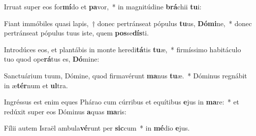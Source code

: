 \item Irruat super eos for\textbf{mí}do et \textbf{pa}vor,~* in magnitúdine \textbf{brá}chii \textbf{tu}i:
\item Fiant immóbiles quasi lapis,~† donec pertránseat pópulus \textbf{tu}us, \textbf{Dó}\textbf{mi}ne,~* donec pertránseat pópulus tuus iste, quem \textbf{pos}se\textbf{dís}ti.
\item Introdúces eos, et plantábis in monte heredi\textbf{tá}tis \textbf{tu}æ,~* firmíssimo habitáculo tuo quod ope\textbf{rá}tus es, \textbf{Dó}mine:
\item Sanctuárium tuum, Dómine, quod firmavérunt \textbf{ma}nus \textbf{tu}æ.~* Dóminus regnábit in æ\textbf{tér}num et \textbf{ul}tra.
\item Ingréssus est enim eques Phárao cum cúrribus et equítibus \textbf{e}jus in \textbf{ma}re:~* et redúxit super eos Dóminus \textbf{a}quas \textbf{ma}ris:
\item Fílii autem Israël ambula\textbf{vé}runt per \textbf{sic}cum~* in \textbf{mé}dio \textbf{e}jus.
